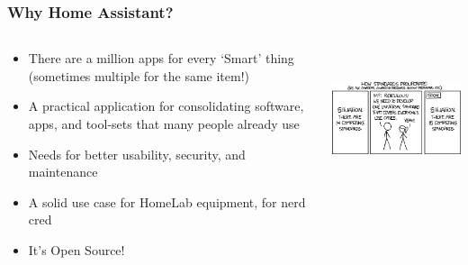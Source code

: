 \documentclass[aspectratio=169]{beamer}
\begin{document}
\begin{frame}[fragile]
  \frametitle{Why Home Assistant?}
  \begin{columns}[]
    \begin{column}[T]{0.45\paperwidth}
      \begin{itemize}%
        \item{There are a million apps for every `Smart' thing (sometimes multiple for the same item!)}
        \item{A practical application for consolidating software, apps, and tool-sets that many people already use}
        \item{Needs for better usability, security, and maintenance}
        \item{A solid use case for HomeLab equipment, for nerd cred}
        \item{It's Open Source!}
     \end{itemize}
    \end{column}
    \begin{column}[T]{0.45\paperwidth}
      \includegraphics[height=4cm,keepaspectratio]{images/standards.png}
    \end{column}
  \end{columns}
\end{frame}
\end{document}
